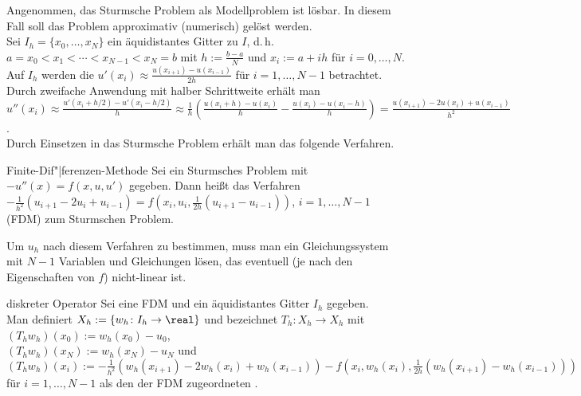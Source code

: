 \begin{Bem}
    Angenommen, das Sturmsche Problem als Modellproblem ist lösbar.
    In diesem Fall soll das Problem approximativ (numerisch) gelöst werden.\\
    Sei $I_h = \{x_0, \dotsc, x_N\}$ ein äquidistantes Gitter zu $I$, d.\,h.
    $a = x_0 < x_1 < \dotsb < x_{N-1} < x_N = b$ mit
    $h := \frac{b - a}{N}$ und $x_i := a + ih$ für $i = 0, \dotsc, N$.\\
    Auf $I_h$ werden die 
    $u'(x_i) \approx \frac{u(x_{i+1}) - u(x_{i-1})}{2h}$ für
    $i = 1, \dotsc, N - 1$ betrachtet.
    Durch zweifache Anwendung mit halber Schrittweite erhält man\\
    $u''(x_i) \approx \frac{u'(x_i + h/2) - u'(x_i - h/2)}{h} \approx
    \frac{1}{h} \left(\frac{u(x_i + h) - u(x_i)}{h} -
    \frac{u(x_i) - u(x_i - h)}{h}\right) =
    \frac{u(x_{i+1}) - 2 u(x_i) + u(x_{i-1})}{h^2}$.\\
    Durch Einsetzen in das Sturmsche Problem erhält man das folgende Verfahren.
\end{Bem}

\begin{Def}{Finite-Dif"|ferenzen-Methode}
    Sei ein Sturmsches Problem mit $-u''(x) = f(x, u, u')$ gegeben.
    Dann heißt das Verfahren
    $-\frac{1}{h^2} (u_{i+1} - 2 u_i + u_{i-1}) =
    f(x_i, u_i, \frac{1}{2h} (u_{i+1} - u_{i-1}))$, $i = 1, \dotsc, N - 1$
     (FDM) zum Sturmschen Problem.
\end{Def}

\begin{Bem}
    Um $u_h$ nach diesem Verfahren zu bestimmen, muss man ein Gleichungssystem
    mit $N - 1$ Variablen und Gleichungen lösen, das eventuell
    (je nach den Eigenschaften von $f$) nicht-linear ist.
\end{Bem}

\linie

\begin{Def}{diskreter Operator}
    Sei eine FDM und ein äquidistantes Gitter $I_h$ gegeben.\\
    Man definiert $X_h := \{w_h\colon I_h \rightarrow \real\}$ und bezeichnet
    $T_h\colon X_h \rightarrow X_h$ mit\\
    $(T_h w_h)(x_0) := w_h(x_0) - u_0$,\\
    $(T_h w_h)(x_N) := w_h(x_N) - u_N$ und\\
    $(T_h w_h)(x_i) :=
    -\frac{1}{h^2} (w_h(x_{i+1}) - 2 w_h(x_i) + w_h(x_{i-1})) -
    f(x_i, w_h(x_i), \frac{1}{2h} (w_h(x_{i+1}) - w_h(x_{i-1})))$\\
    für $i = 1, \dotsc, N - 1$
    als den der FDM zugeordneten .
\end{Def}


